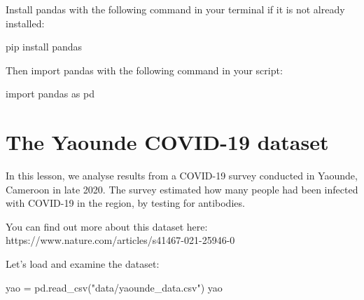 \documentclass[
  letterpaper,
  DIV=11,
  numbers=noendperiod]{scrreprt}
\newenvironment{Shaded}{\begin{snugshade}}{\end{snugshade}}
\newcommand{\ImportTok}[1]{\textcolor[rgb]{0.00,0.46,0.62}{#1}}
\newcommand{\NormalTok}[1]{\textcolor[rgb]{0.00,0.23,0.31}{#1}}
\newcommand{\OperatorTok}[1]{\textcolor[rgb]{0.37,0.37,0.37}{#1}}
\newcommand{\StringTok}[1]{\textcolor[rgb]{0.13,0.47,0.30}{#1}}
\begin{document}
Install pandas with the following command in your terminal if it is not
already installed:

\begin{Shaded}
\begin{Highlighting}[]
\NormalTok{pip install pandas }
\end{Highlighting}
\end{Shaded}

Then import pandas with the following command in your script:

\begin{Shaded}
\begin{Highlighting}[]
\ImportTok{import}\NormalTok{ pandas }\ImportTok{as}\NormalTok{ pd}
\end{Highlighting}
\end{Shaded}

\section{The Yaounde COVID-19
dataset}\label{the-yaounde-covid-19-dataset}

In this lesson, we analyse results from a COVID-19 survey conducted in
Yaounde, Cameroon in late 2020. The survey estimated how many people had
been infected with COVID-19 in the region, by testing for antibodies.

You can find out more about this dataset here:
https://www.nature.com/articles/s41467-021-25946-0

Let's load and examine the dataset:

\begin{Shaded}
\begin{Highlighting}[]
\NormalTok{yao }\OperatorTok{=}\NormalTok{ pd.read\_csv(}\StringTok{"data/yaounde\_data.csv"}\NormalTok{)}
\NormalTok{yao}
\end{Highlighting}
\end{Shaded}
\end{document}
